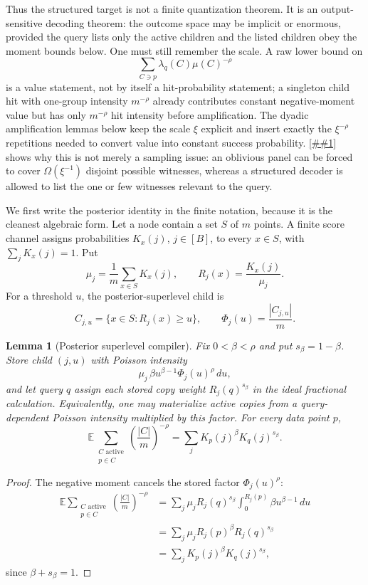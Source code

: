 \documentclass[10pt]{article}
\newcommand{\Cref}[1]{\ref{##1}}
\newtheorem{lemma}[theorem]{Lemma}
\theoremstyle{definition}
\newcommand{\E}{\mathbb{E}}
\begin{document}
Thus the structured target is not a finite quantization theorem. It is an output-sensitive decoding theorem: the outcome space may be implicit or enormous, provided the query lists only the active children and the listed children obey the moment bounds below. One must still remember the scale. A raw lower bound on
\[
   \sum_{C\ni p}\lambda_q(C)\mu(C)^{-\rho}
\]
is a value statement, not by itself a hit-probability statement; a singleton child hit with one-group intensity $m^{-\rho}$ already contributes constant negative-moment value but has only $m^{-\rho}$ hit intensity before amplification. The dyadic amplification lemmas below keep the scale $\xi$ explicit and insert exactly the $\xi^{-\rho}$ repetitions needed to convert value into constant success probability.
\Cref{lem:oblivious-sparsification-barrier} shows why this is not merely a
sampling issue: an oblivious panel can be forced to cover $\Omega(\xi^{-1})$
disjoint possible witnesses, whereas a structured decoder is allowed to list the
one or few witnesses relevant to the query.

We first write the posterior identity in the finite notation, because it is the cleanest algebraic form. Let a node contain a set $S$ of $m$ points. A finite score channel assigns probabilities $K_x(j)$, $j\in[B]$, to every $x\in S$, with $\sum_jK_x(j)=1$. Put
\[
   \mu_j=\frac1m\sum_{x\in S}K_x(j),
   \qquad
   R_j(x)=\frac{K_x(j)}{\mu_j}.
\]
For a threshold $u$, the posterior-superlevel child is
\[
   C_{j,u}=\{x\in S:R_j(x)\ge u\},
   \qquad
   \Phi_j(u)=\frac{|C_{j,u}|}{m}.
\]

\begin{lemma}[Posterior superlevel compiler]\label{lem:posterior-superlevel-compiler}
   Fix $0<\beta<\rho$ and put $s_\beta=1-\beta$. Store child $(j,u)$ with Poisson intensity
   \[
      \mu_j\,\beta u^{\beta-1}\Phi_j(u)^\rho\,du,
   \]
   and let query $q$ assign each stored copy weight $R_j(q)^{s_\beta}$ in the ideal fractional calculation. Equivalently, one may materialize active copies from a query-dependent Poisson intensity multiplied by this factor. For every data point $p$,
   \[
      \E\sum_{\substack{C\text{ active}\\p\in C}}
      \left(\frac{|C|}{m}\right)^{-\rho}
      =
      \sum_jK_p(j)^\beta K_q(j)^{s_\beta}.
   \]
\end{lemma}

\begin{proof}
   The negative moment cancels the stored factor $\Phi_j(u)^\rho$:
   \[
   \begin{aligned}
      \E\sum_{\substack{C\text{ active}\\p\in C}}
      \left(\frac{|C|}{m}\right)^{-\rho}
      &=
      \sum_j\mu_jR_j(q)^{s_\beta}
      \int_0^{R_j(p)}\beta u^{\beta-1}\,du\\
      &=
      \sum_j\mu_jR_j(p)^\beta R_j(q)^{s_\beta}\\
      &=
      \sum_jK_p(j)^\beta K_q(j)^{s_\beta},
   \end{aligned}
   \]
   since $\beta+s_\beta=1$.
\end{proof}
\end{document}
